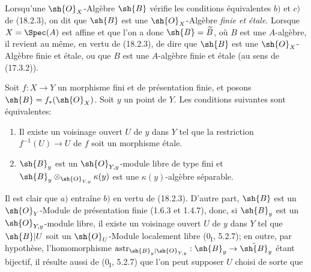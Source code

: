 Lorsqu'une $\sh{O}_X$-Algèbre $\sh{B}$ vérifie les conditions équivalentes $b)$ et $c)$ de (18.2.3), on dit que $\sh{B}$ est une $\sh{O}_X$-Algèbre \emph{finie et étale}. Lorsque $X=\Spec(A)$ est affine et que l'on a donc $\sh{B}=\widetilde B$, où $B$ est une $A$-algèbre, il revient au même, en vertu de (18.2.3), de dire que $\sh{B}$ est une $\sh{O}_X$-Algèbre finie et étale, ou que $B$ est une $A$-algèbre finie et étale (au sens de (17.3.2)).

\begin{corollary}[18.2.4]
\label{IV.18.2.4}
Soit $f:X\to Y$ un morphisme fini et de présentation finie, et posons $\sh{B}=f_*(\sh{O}_X)$. Soit $y$ un point de $Y$. Les conditions suivantes sont équivalentes:
\begin{enumerate}
  \item[a)] Il existe un voisinage ouvert $U$ de $y$ dans $Y$ tel que la restriction $f^{-1}(U)\to U$ de $f$ soit un morphisme étale.
  \item[b)] $\sh{B}_y$ est un $\sh{O}_{Y,y}$-module libre de type fini et $\sh{B}_y\otimes_{\sh{O}_{Y,y}}\kappa(y)$ est une $\kappa(y)$-algèbre séparable.
\end{enumerate}
\end{corollary}

Il est clair que $a)$ entraîne $b)$ en vertu de (18.2.3). D'autre part, $\sh{B}$ est un $\sh{O}_Y$-Module de présentation finie (1.6.3 et 1.4.7), donc, si $\sh{B}_y$ est un $\sh{O}_{Y,y}$-module libre, il existe un voisinage ouvert $U$ de $y$ dans $Y$ tel que $\sh{B}|U$ soit un $\sh{O}_U$-Module localement libre ($0_{\mathrm I}$, 5.2.7); en outre, par hypothèse, l'homomorphisme $\operatorname{astr}_{\sh{B}_y|\sh{O}_{Y,y}}:\sh{B}_y\to\check{\sh{B}}_y$ étant bijectif, il résulte aussi de ($0_{\mathrm I}$, 5.2.7) que l'on peut supposer $U$ choisi de sorte que

